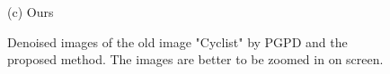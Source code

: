 \documentclass[runningheads]{llncs}
\begin{document}
\begin{figure}
{\begin{minipage}[t]{0.33\textwidth}
{\footnotesize (c) Ours }
\end{minipage}
}
\caption{Denoised images of the old image "Cyclist" by PGPD and the proposed method. The images are better to be zoomed in on screen.}
\label{fig40}
\end{figure}
\end{document}
